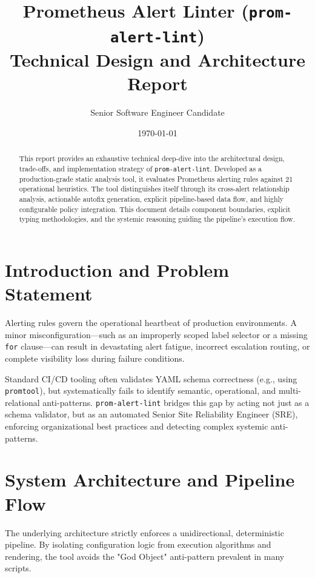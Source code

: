 \documentclass[a4paper,11pt]{article}
\title{\Huge \textbf{Prometheus Alert Linter (\texttt{prom-alert-lint})}\\
\vspace{0.5em}
\LARGE \textnormal{Technical Design and Architecture Report}}
\author{Senior Software Engineer Candidate}
\date{\today}
\begin{document}
\maketitle

\begin{abstract}
\noindent
This report provides an exhaustive technical deep-dive into the architectural design, trade-offs, and implementation strategy of \texttt{prom-alert-lint}. Developed as a production-grade static analysis tool, it evaluates Prometheus alerting rules against 21 operational heuristics. The tool distinguishes itself through its cross-alert relationship analysis, actionable autofix generation, explicit pipeline-based data flow, and highly configurable policy integration. This document details component boundaries, explicit typing methodologies, and the systemic reasoning guiding the pipeline's execution flow.
\end{abstract}

\tableofcontents
\newpage

\section{Introduction and Problem Statement}
Alerting rules govern the operational heartbeat of production environments. A minor misconfiguration—such as an improperly scoped label selector or a missing \texttt{for} clause—can result in devastating alert fatigue, incorrect escalation routing, or complete visibility loss during failure conditions.

Standard CI/CD tooling often validates YAML schema correctness (e.g., using \texttt{promtool}), but systematically fails to identify semantic, operational, and multi-relational anti-patterns. \texttt{prom-alert-lint} bridges this gap by acting not just as a schema validator, but as an automated Senior Site Reliability Engineer (SRE), enforcing organizational best practices and detecting complex systemic anti-patterns.

\section{System Architecture and Pipeline Flow}
The underlying architecture strictly enforces a unidirectional, deterministic pipeline. By isolating configuration logic from execution algorithms and rendering, the tool avoids the "God Object" anti-pattern prevalent in many scripts.
\end{document}
